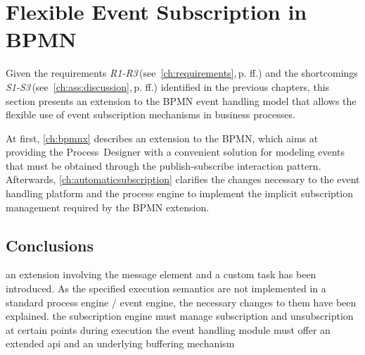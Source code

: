 \chapter{Flexible Event Subscription in BPMN}\label{ch:flexibleeventsubscription}

Given the requirements \textit{R1-R3}\,(see~\autoref{ch:requirements},\,p.\,\pageref{ch:requirements}\,ff.) and the shortcomings \textit{S1-S3}\,(see~\autoref{ch:ass:discussion},\,p.\,\pageref{ch:ass:discussion}\,ff.) identified in the previous chapters, this section presents an extension to the BPMN event handling model that allows the flexible use of event subscription mechanisms in business processes.

At first, \ref{ch:bpmnx} describes an extension to the \acf{BPMN}, which aims at providing the Process~Designer with a convenient solution for modeling events that must be obtained through the publish-subscribe interaction pattern.
Afterwards, \autoref{ch:automaticsubscription} clarifies the changes necessary to the event handling platform and the process engine to implement the implicit subscription management required by the BPMN extension.



\label{fig:concept-modules}





\section{Conclusions}


an extension involving the message element and a custom task has been introduced.
As the specified execution semantics are not implemented in a standard process engine / event engine, the necessary changes to them have been explained.
the subscription engine must manage subscription and unsubscription at certain points during execution
the event handling module must offer an extended api and an underlying buffering mechanism

